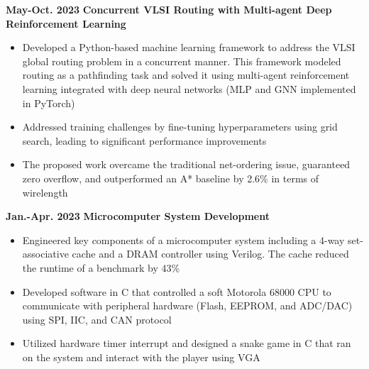 \documentclass[11pt,a4paper,sans]{moderncv}
\begin{document}
\cventry
{\textnormal{\textbf{May-Oct. 2023}}}
{\textnormal{\textbf{Concurrent VLSI Routing with Multi-agent
Deep Reinforcement Learning}}}
{}{}{}
{
    \begin{itemize}
        \item Developed a Python-based machine learning framework to address the VLSI global routing problem in a concurrent manner. This framework modeled routing as a pathfinding task and solved it using multi-agent reinforcement learning integrated with deep neural networks (MLP and GNN implemented in PyTorch)
        \item Addressed training challenges by fine-tuning hyperparameters using grid search, leading to significant performance improvements
        \item The proposed work overcame the traditional net-ordering issue, guaranteed zero overflow, and outperformed an A* baseline by 2.6\% in terms of wirelength
        \end{itemize}
}


\cventry
{\textnormal{\textbf{Jan.-Apr. 2023}}}
{\textnormal{\textbf{Microcomputer System Development}}}
{}{}{}
{
    \begin{itemize}
    \item Engineered key components of a microcomputer system including a 4-way set-associative cache and a DRAM controller using Verilog. The cache reduced the runtime of a benchmark by 43\% 
    \item Developed software in C that controlled a soft Motorola 68000 CPU to communicate with peripheral hardware (Flash, EEPROM, and ADC/DAC) using SPI, IIC, and CAN protocol 
    \item Utilized hardware timer interrupt and designed a snake game in C that ran on the system and interact with the player using VGA
    \end{itemize}
}
\end{document}
